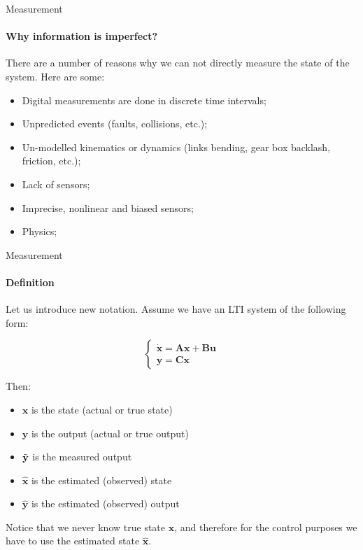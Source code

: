 \documentclass{beamer}
\begin{document}
\begin{frame}{Measurement}
\framesubtitle{Why information is imperfect?}
\begin{flushleft}

There are a number of reasons why we can not directly measure the state of the system. Here are some:

\begin{itemize}
\item Digital measurements are done in discrete time intervals;
\item Unpredicted events (faults, collisions, etc.);
\item Un-modelled kinematics or dynamics (links bending, gear box backlash,  friction, etc.);
\item Lack of sensors;
\item Imprecise, nonlinear and biased sensors;
\item Physics;
\end{itemize}

\end{flushleft}
\end{frame}

\begin{frame}{Measurement}
\framesubtitle{Definition}
\begin{flushleft}

Let us introduce new notation. Assume we have an LTI system of the following form:

\[
\begin{cases}
\dot {\mathbf x} = \mathbf A \mathbf x + \mathbf B \mathbf u\\
\mathbf y = \mathbf C \mathbf x
\end{cases}
\]

Then:

\begin{itemize}
\item $\mathbf x$ is the state (actual or true state)
\item $\mathbf y$ is the output (actual or true output)
\item $\Tilde{\mathbf y}$ is the measured output
\item $\hat{\mathbf x}$ is the estimated (observed) state
\item $\hat{\mathbf y}$ is the estimated (observed) output
\end{itemize}

Notice that we never know true state $\mathbf x$, and therefore for the control purposes we have to use the estimated state $\hat{\mathbf x}$.

\end{flushleft}
\end{frame}
\end{document}
